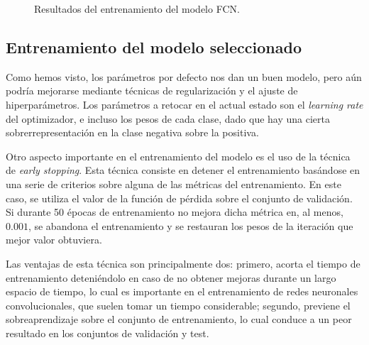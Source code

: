 \begin{figure}[H]
  \centering
  \caption{Resultados del entrenamiento del modelo FCN.}
  \label{fig:fcn}
\end{figure}


\subsection{Entrenamiento del modelo seleccionado}

Como hemos visto, los parámetros por defecto nos dan un buen modelo, pero aún podría mejorarse mediante técnicas de regularización y el ajuste de hiperparámetros. Los parámetros a retocar en el actual estado son el \textit{learning rate} del optimizador, e incluso los pesos de cada clase, dado que hay una cierta sobrerrepresentación en la clase negativa sobre la positiva.

Otro aspecto importante en el entrenamiento del modelo es el uso de la técnica de \textit{early stopping}. Esta técnica consiste en detener el entrenamiento basándose en una serie de criterios sobre alguna de las métricas del entrenamiento. En este caso, se utiliza el valor de la función de pérdida sobre el conjunto de validación. Si durante 50 épocas de entrenamiento no mejora dicha métrica en, al menos, $0.001$, se abandona el entrenamiento y se restauran los pesos de la iteración que mejor valor obtuviera.

Las ventajas de esta técnica son principalmente dos: primero, acorta el tiempo de entrenamiento deteniéndolo en caso de no obtener mejoras durante un largo espacio de tiempo, lo cual es importante en el entrenamiento de redes neuronales convolucionales, que suelen tomar un tiempo considerable; segundo, previene el sobreaprendizaje sobre el conjunto de entrenamiento, lo cual conduce a un peor resultado en los conjuntos de validación y test.

